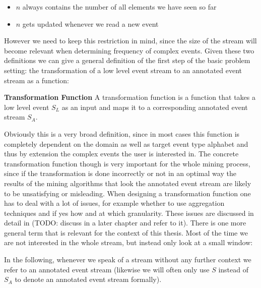 \begin{itemize}
	\item $n$ always contains the number of all elements we have seen so far
	\item $n$ gets updated whenever we read a new event
\end{itemize}

However we need to keep this restriction in mind, since the size of the stream will become relevant when determining frequency of complex events.
Given these two definitions we can give a general definition of the first step of the basic problem setting: the transformation of a low level event stream to an annotated event stream as a function:

\begin{mydef}
\textbf{Transformation Function} A transformation function is a function that takes a low level event $S_L$ as an input and maps it to a corresponding annotated event stream $S_A$.
\end{mydef}
Obviously this is a very broad definition, since in most cases this function is completely dependent on the domain as well as target event type alphabet and thus by extension the complex events the user is interested in. The concrete transformation function though is very important for the whole mining process, since if the transformation is done incorrectly or not in an optimal way the results of the mining algorithms that look the annotated event stream are likely to be unsatisfying or misleading. When designing a transformation function one has to deal with a lot of issues, for example whether to use aggregation techniques and if yes how and at which granularity. These issues are discussed in detail in (TODO: discuss in a later chapter and refer to it). \newline
There is one more general term that is relevant for the context of this thesis. Most of the time we are not interested in the whole stream, but instead only look at a small window:


In the following, whenever we speak of a stream without any further context we refer to an annotated event stream (likewise we will often only use $S$ instead of $S_A$ to denote an annotated event stream formally).

